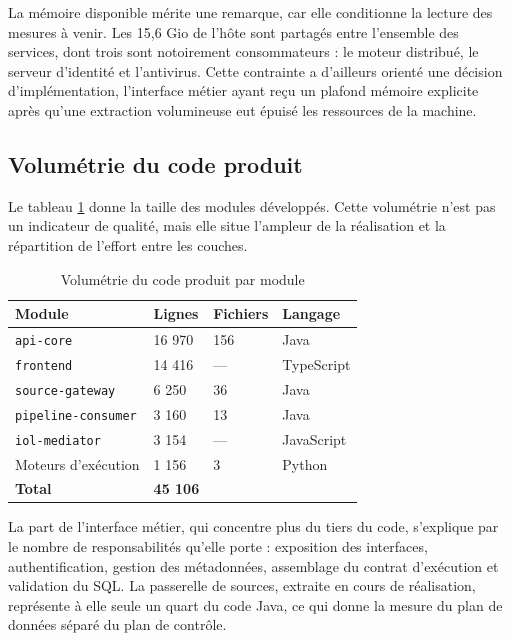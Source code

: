 \noindent
La mémoire disponible mérite une remarque, car elle conditionne la lecture des
mesures à venir. Les 15,6 Gio de l'hôte sont partagés entre l'ensemble des
services, dont trois sont notoirement consommateurs : le moteur distribué, le
serveur d'identité et l'antivirus. Cette contrainte a d'ailleurs orienté une
décision d'implémentation, l'interface métier ayant reçu un plafond mémoire
explicite après qu'une extraction volumineuse eut épuisé les ressources de la
machine.



\subsection{Volumétrie du code produit}

Le tableau \ref{tab:volumetrie-code} donne la taille des modules développés. Cette
volumétrie n'est pas un indicateur de qualité, mais elle situe l'ampleur de la
réalisation et la répartition de l'effort entre les couches.

\begin{table}[htbp]
\centering
\caption{Volumétrie du code produit par module}
\label{tab:volumetrie-code}
\small
\begin{tabularx}{\textwidth}{|p{3.6cm}|p{2.2cm}|p{2cm}|X|}
\hline
\textbf{Module} & \textbf{Lignes} & \textbf{Fichiers} & \textbf{Langage} \\ \hline

\texttt{api-core} & 16 970 & 156 & Java \\ \hline
\texttt{frontend} & 14 416 & --- & TypeScript \\ \hline
\texttt{source-\allowbreak gateway} & 6 250 & 36 & Java \\ \hline
\texttt{pipeline-\allowbreak consumer} & 3 160 & 13 & Java \\ \hline
\texttt{iol-mediator} & 3 154 & --- & JavaScript \\ \hline
Moteurs d'exécution & 1 156 & 3 & Python \\ \hline
\textbf{Total} & \textbf{45 106} & & \\ \hline

\end{tabularx}
\end{table}

\noindent
La part de l'interface métier, qui concentre plus du tiers du code, s'explique par
le nombre de responsabilités qu'elle porte : exposition des interfaces,
authentification, gestion des métadonnées, assemblage du contrat d'exécution et
validation du SQL. La passerelle de sources, extraite en cours de réalisation,
représente à elle seule un quart du code Java, ce qui donne la mesure du plan de
données séparé du plan de contrôle.


